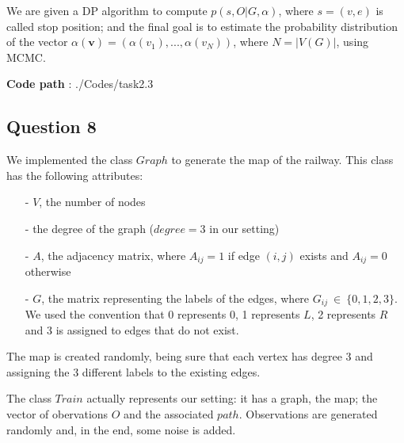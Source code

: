 \documentclass[]{article}
\begin{document}
	We are given a DP algorithm to compute $p(s,O|G,\alpha)$, where $s=(v,e)$ is called stop position; and the final goal is to estimate the probability distribution of the vector $\alpha(\mathbf{v}) = (\alpha(v_1), ..., \alpha(v_N))$,  where $ N=|V(G)| $, using MCMC.
	
	\textbf{Code path} : ./Codes/task2.3  
	
	\subsection*{Question 8}
	We implemented the class $Graph$ to generate the map of the railway. This class has the following attributes:
	\begin{enumerate}
		\item[-] $V$, the number of nodes 
		\item[-] the degree of the graph ($degree=3$ in our setting) 
		\item[-] $A$, the adjacency matrix, where $A_{ij}=1$ if edge $(i,j)$ exists and $A_{ij}=0$ otherwise
		\item[-] $G$, the matrix representing the labels of the edges, where $G_{ij} \ \in \ \{ 0,1,2,3\} $. We used the convention that 0 represents 0, 1 represents $L$, 2 represents $R$ and 3 is assigned to edges that do not exist.
	\end{enumerate} 
	The map is created randomly, being sure that each vertex has degree 3 and assigning the 3 different labels to the existing edges.
	
	The class $Train$ actually represents our setting: it has a graph, the map; the vector of obervations $O$ and the associated $path$. Observations are generated randomly and, in the end, some noise is added.
	
\end{document}
